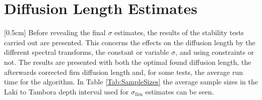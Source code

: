 \documentclass[../../CompleteThesis2/Complete_2ndDraft]{subfiles}
\begin{document}
\section[Diffusion Lengths]{Diffusion Length Estimates}
\label{Sec:Results_DiffLenEst}
[0.5cm]%
Before revealing the final $\sigma$ estimates, the results of the stability tests carried out are presented. This concerns the effects on the diffusion length by the different spectral transforms, the constant or variable $\sigma$, and using constraints or not. The results are presented with both the optimal found diffusion length, the afterwards corrected firn diffusion length and, for some tests, the average run time for the algorithm. In Table \ref{Tab:SampleSizes} the average sample sizes in the Laki to Tambora depth interval used for $\sigma_{\text{firn}}$ estimates can be seen.




%
%
%
%
%
%
%
\end{document}
